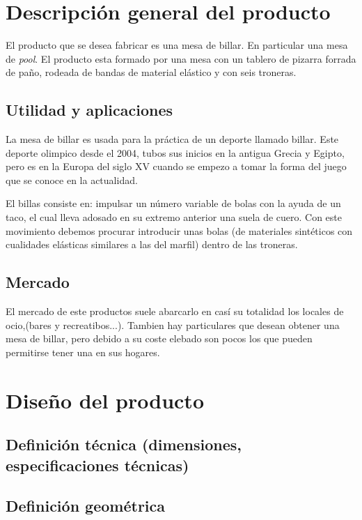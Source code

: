 \section {Descripción general del producto}
	El producto que se desea fabricar es una mesa de billar. En particular una mesa de \emph{pool}.
El producto esta formado por una  mesa con un tablero de pizarra forrada de paño, rodeada de bandas de material elástico y con seis troneras. 
	
	\subsection {Utilidad y aplicaciones}
	La mesa de billar es usada para la práctica de un deporte llamado billar. Este deporte olimpico desde el 2004, tubos sus inicios en la 
 antigua  Grecia y Egipto, pero es en la Europa del siglo XV cuando se empezo a tomar la forma del juego que se conoce en la actualidad. 

El billas consiste en: impulsar un número variable de bolas con la ayuda de un taco,  el cual lleva adosado en su extremo anterior una suela de cuero.
Con este movimiento debemos procurar introducir unas bolas (de materiales sintéticos con cualidades elásticas similares a las del marfil) dentro de las troneras.

	\subsection {Mercado}

El mercado de este productos suele abarcarlo en casí su totalidad los locales de ocio,(bares y recreatibos...). Tambien hay particulares que desean obtener una
mesa de billar, pero debido a su coste elebado son pocos los que pueden permitirse tener una en sus hogares. 
    
\section {Diseño del producto}

	\subsection {Definición técnica (dimensiones, especificaciones técnicas)}

	\subsection {Definición geométrica}

